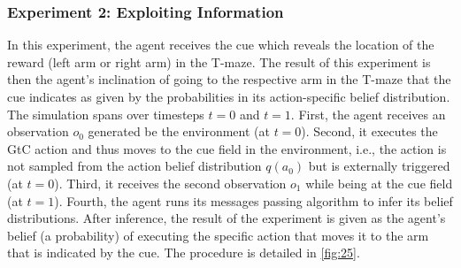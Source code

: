 \subsubsection{Experiment 2: Exploiting Information}

In this experiment, the agent receives the cue which reveals the location of the reward (left arm or right arm) in the T-maze. The result of this experiment is then the agent's inclination of going to the respective arm in the T-maze that the cue indicates as given by the probabilities in its action-specific belief distribution. The simulation spans over timesteps \(t=0\) and \(t=1\). First, the agent receives an observation \(o_0\) generated be the environment (at \(t=0\)). Second, it executes the GtC action and thus moves to the cue field in the environment, i.e., the action is not sampled from the action belief distribution \(q(a_0)\) but is externally triggered (at \(t=0\)). Third, it receives the second observation \(o_1\) while being at the cue field (at \(t=1\)). Fourth, the agent runs its messages passing algorithm to infer its belief distributions. After inference, the result of the experiment is given as the agent's belief (a probability) of executing the specific action that moves it to the arm that is indicated by the cue. The procedure is detailed in \cref{fig:25}.

